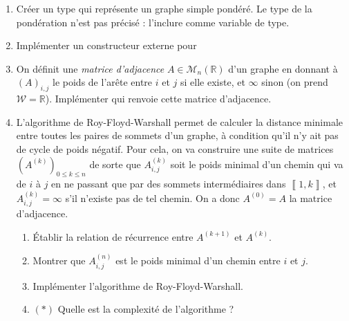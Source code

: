 \documentclass{article}
\newcommand{\llbra}{\left\llbracket}
\newcommand{\rrbra}{\right\rrbracket}
\renewcommand{\brack}[1]{\ensuremath{\llbra#1\rrbra}}
\newcommand{\der}[2]{#1^{\ensuremath{\left(#2\right)}}}
\newcommand{\paren}[1]{\ensuremath{\left(#1\right)}}
\newcommand{\matr}[2]{\mathcal{M}_{#1}\paren{#2}}
\newcommand{\R}{\mathbb{R}}
\begin{document}
\begin{enumerate}
	\item Créer un type  qui représente un graphe simple pondéré. Le type de la pondération n'est pas précisé : l'inclure comme variable de type.

	\item Implémenter un constructeur externe pour 

	\item On définit une \emph{matrice d'adjacence} $A\in\matr n\R$ d'un graphe en donnant à $(A)_{i,j}$ le poids de l'arête entre $i$ et $j$ si elle existe, et $\infty$ sinon (on prend $\mathcal W = \R$). Implémenter  qui renvoie cette matrice d'adjacence.
	
	\item L'algorithme de Roy-Floyd-Warshall permet de calculer la distance minimale entre toutes les paires de sommets d'un graphe, à condition qu'il n'y ait pas de cycle de poids négatif. Pour cela, on va construire une suite de matrices $\paren{\der Ak}_{0\le k\le n}$ de sorte que $\der Ak_{i,j}$ soit le poids minimal d'un chemin qui va de $i$ à $j$ en ne passant que par des sommets intermédiaires dans $\brack{1,k}$, et $\der Ak_{i,j} = \infty$ s'il n'existe pas de tel chemin. On a donc $\der A0 = A$ la matrice d'adjacence.
	\begin{enumerate}
		\item Établir la relation de récurrence entre $\der A{k+1}$ et $\der Ak$.
		\item Montrer que $\der An_{i,j}$ est le poids minimal d'un chemin entre $i$ et $j$.
		\item Implémenter l'algorithme de Roy-Floyd-Warshall.
		\item $(*)$ Quelle est la complexité de l'algorithme ?
	\end{enumerate}
\end{enumerate}
\end{document}
